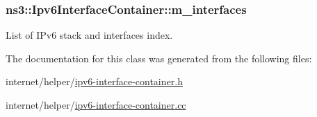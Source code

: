 \subsubsection[{\texorpdfstring{m\+\_\+interfaces}{m_interfaces}}]{ ns3\+::\+Ipv6\+Interface\+Container\+::m\+\_\+interfaces\hspace{0.3cm}{\ttfamily [private]}}\hypertarget{classns3_1_1Ipv6InterfaceContainer_a559846ada263de96a3a5d0408824712d}{}\label{classns3_1_1Ipv6InterfaceContainer_a559846ada263de96a3a5d0408824712d}


List of I\+Pv6 stack and interfaces index. 



The documentation for this class was generated from the following files\+:\begin{DoxyCompactItemize}
\item 
internet/helper/\hyperlink{ipv6-interface-container_8h}{ipv6-\/interface-\/container.\+h}\item 
internet/helper/\hyperlink{ipv6-interface-container_8cc}{ipv6-\/interface-\/container.\+cc}\end{DoxyCompactItemize}
